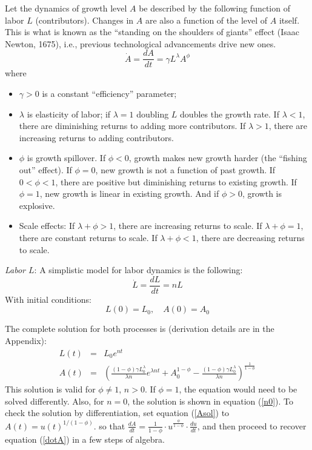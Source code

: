 \documentclass[conference]{IEEEtran}
\begin{document}
Let the dynamics of growth level $A$ be described by the following function of labor $L$ (contributors). Changes in $A$ are also a function of the level of $A$ itself. This is what is known as the ``standing on the shoulders of giants'' effect (Isaac Newton, 1675), i.e., previous technological advancements drive new ones.     
\begin{equation}
{\dot A} = \frac{dA}{dt} = \gamma L^{\lambda} A^{\phi} \label{dotA}    
\end{equation}
where 
\begin{itemize}
\item $\gamma>0$ is a constant ``efficiency'' parameter;
\item $\lambda$ is elasticity of labor; if $\lambda=1$ doubling $L$ doubles the growth rate. If $\lambda<1$, there are diminishing returns to adding more contributors. If $\lambda>1$, there are increasing returns to adding contributors.
\item $\phi$ is growth spillover. If $\phi<0$, growth makes new growth harder (the ``fishing out'' effect). If $\phi=0$, new growth is not a function of past growth. If $0<\phi<1$, there are positive but diminishing returns to existing growth. If $\phi=1$, new growth is linear in existing growth. And if $\phi>0$, growth is explosive.
\item Scale effects: If $\lambda+\phi>1$, there are increasing returns to scale. If $\lambda+\phi=1$, there are constant returns to scale. If $\lambda+\phi<1$, there are decreasing returns to scale.
\end{itemize}
{\it Labor $L$}: A simplistic model for labor dynamics is the following:
\begin{equation}
{\dot L} = \frac{dL}{dt} = n L  \label{dotL}
\end{equation}
With initial conditions:
$$
L(0) = L_0, \quad A(0) = A_0
$$

The complete solution for both processes is (derivation details are in the Appendix):
{\small
\begin{eqnarray}
L(t) &=& L_0e^{nt} \label{Lsol}\\
A(t) &=& \left(\frac{(1-\phi)\gamma L_0^\lambda}{\lambda n}e^{\lambda nt} + A_0^{1-\phi} - \frac{(1-\phi)\gamma L_0^\lambda}{\lambda n}\right)^{\frac{1}{1-\phi}}  \label{Asol}
\end{eqnarray}
}
This solution is valid for $\phi \neq 1$, $n>0$. If $\phi = 1$, the equation would need to be solved differently. Also, for $n=0$, the solution is shown in equation (\ref{n0}). To check the solution by differentiation, set equation (\ref{Asol}) to $A(t)=u(t)^{1/(1-\phi)}$. so that $\frac{dA}{dt}=\frac{1}{1-\phi} \cdot u^{\frac{\phi}{1-\phi}} \cdot \frac{du}{dt}$, and then proceed to recover equation (\ref{dotA}) in a few steps of algebra. 
\end{document}
